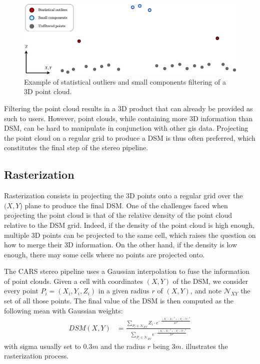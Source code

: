 \begin{figure}
    \centering
    \includegraphics[width=\linewidth]{Images/Chap_1/Point_cloud_filtering.png}
    \caption{Example of statistical outliers and small components filtering of a 3D point cloud.}
    \label{fig:point_cloud_filtering}
\end{figure}

Filtering the point cloud results in a 3D product that can already be provided as such to users. However, point clouds, while containing more 3D information than DSM, can be hard to manipulate in conjunction with other \acrshort{gis} data. Projecting the point cloud on a regular grid to produce a DSM is thus often preferred, which constitutes the final step of the stereo pipeline.

\subsection{Rasterization}
Rasterization consists in projecting the 3D points onto a regular grid over the $(X,Y$) plane to produce the final DSM. One of the challenges faced when projecting the point cloud is that of the relative density of the point cloud relative to the DSM grid. Indeed, if the density of the point cloud is high enough, multiple 3D points can be projected to the same cell, which raises the question on how to merge their 3D information. On the other hand, if the density is low enough, there may some cells where no points are projected onto. 

The CARS stereo pipeline uses a Gaussian interpolation to fuse the information of point clouds. Given a cell with coordinates $(X,Y)$ of the DSM, we consider every point $P_i=(X_i, Y_i, Z_i)$ in a given radius $r$ of $(X,Y)$, and note $\mathcal{N}_{XY}$ the set of all those points. The final value of the DSM is then computed as the following mean with Gaussian weights:
\begin{align}
    DSM(X,Y) &= \frac{\sum_{P_i\in\mathcal{N}_{XY}}Z_i\cdot e^{-\frac{(X_i-X)^2+(Y_i-Y)^2}{2\sigma^2}}}{\sum_{P_i\in\mathcal{N}_{XY}} e^{-\frac{(X_i-X)^2+(Y_i-Y)^2}{2\sigma^2}}}
\end{align}
with sigma usually set to $0.3m$ and the radius $r$ being $3m$.  illustrates the rasterization process.

